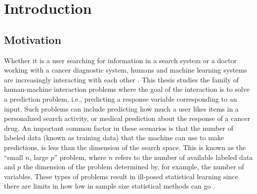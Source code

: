 \documentclass[dissertation,math,vertlayout,pdfa,colorlinks]{aaltoseries}
\begin{document}


\chapter{Introduction}

\section{Motivation}

Whether it is a user searching for information in a search system or a doctor working with a cancer diagnostic system, humans and machine learning systems are increasingly interacting with each other \cite{amershi2014power}. This thesis studies the family of human-machine interaction problems where the goal of the interaction is to solve a prediction problem, i.e., predicting a response variable corresponding to an input. Such problems can include predicting how much a user likes items in a personalized search activity, or medical prediction about the response of a cancer drug. An important common factor in these scenarios is that the number of labeled data (known as training data) that the machine can use to make predictions, is less than the dimension of the search space. This is known as the ``small $n$, large $p$'' problem, where $n$ refers to the number of available labeled data and $p$ the dimension of the problem determined by, for example, the number of variables. These types of problems result in ill-posed statistical learning since there are limits in how low in sample size statistical methods can go \cite{Donoho2009observed}. 

 

\end{document}
